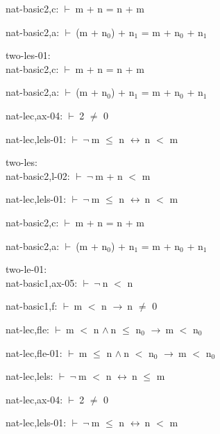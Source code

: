 \documentclass[a4paper]{article}
\newcommand{\Fol}{\mbox{$\vdash\ $}}
\newcommand{\Not}{\mbox{$\neg\ $}}
\newcommand{\And}{\mbox{$\wedge\ $}}
\newcommand{\Imp}{\mbox{$\rightarrow\ $}}
\newcommand{\Equiv}{\mbox{$\leftrightarrow\ $}}
\begin{document}
nat-basic2,c: 
 \Fol m + n = n + m



nat-basic2,a: 
 \Fol (m + $\mbox{n}_{0}$) + $\mbox{n}_{1}$ = m + $\mbox{n}_{0}$ + $\mbox{n}_{1}$



\bigskip

two-les-01:\\ nat-basic2,c: 
 \Fol m + n = n + m



nat-basic2,a: 
 \Fol (m + $\mbox{n}_{0}$) + $\mbox{n}_{1}$ = m + $\mbox{n}_{0}$ + $\mbox{n}_{1}$



nat-lec,ax-04: 
 \Fol 2 $\neq$ 0



nat-lec,lels-01: 
 \Fol \Not m $\le$ n \Equiv n $<$ m



\bigskip

two-les:\\ nat-basic2,l-02: 
 \Fol \Not m + n $<$ m



nat-lec,lels-01: 
 \Fol \Not m $\le$ n \Equiv n $<$ m



nat-basic2,c: 
 \Fol m + n = n + m



nat-basic2,a: 
 \Fol (m + $\mbox{n}_{0}$) + $\mbox{n}_{1}$ = m + $\mbox{n}_{0}$ + $\mbox{n}_{1}$



\bigskip

two-le-01:\\ nat-basic1,ax-05: 
 \Fol \Not n $<$ n



nat-basic1,f: 
 \Fol m $<$ n \Imp n $\neq$ 0



nat-lec,fle: 
 \Fol m $<$ n \And n $\le$ $\mbox{n}_{0}$ \Imp m $<$ $\mbox{n}_{0}$



nat-lec,fle-01: 
 \Fol m $\le$ n \And n $<$ $\mbox{n}_{0}$ \Imp m $<$ $\mbox{n}_{0}$



nat-lec,lels: 
 \Fol \Not m $<$ n \Equiv n $\le$ m



nat-lec,ax-04: 
 \Fol 2 $\neq$ 0



nat-lec,lels-01: 
 \Fol \Not m $\le$ n \Equiv n $<$ m
\end{document}
